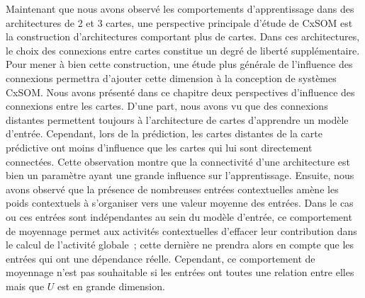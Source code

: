 \documentclass[../main]{subfiles}
\begin{document}
Maintenant que nous avons observé les comportements d'apprentissage dans des architectures de 2 et 3 cartes, une perspective principale d'étude de CxSOM est la construction d'architectures comportant plus de cartes.
Dans ces architectures, le choix des connexions entre cartes constitue un degré de liberté supplémentaire.
Pour mener à bien cette construction, une étude plus générale de l'influence des connexions permettra d'ajouter cette dimension à la conception de systèmes CxSOM.
Nous avons présenté dans ce chapitre deux perspectives d'influence des connexions entre les cartes.
D'une part, nous avons vu que des connexions distantes permettent toujours à l'architecture de cartes d'apprendre un modèle d'entrée. Cependant, lors de la prédiction, les cartes distantes de la carte prédictive ont moins d'influence que les cartes qui lui sont directement connectées. Cette observation montre que la connectivité d'une architecture est bien un paramètre ayant une grande influence sur l'apprentissage. 
Ensuite, nous avons observé que la présence de nombreuses entrées contextuelles amène les poids contextuels à s'organiser vers une valeur moyenne des entrées. Dans le cas ou ces entrées sont indépendantes au sein du modèle d'entrée, ce comportement de moyennage permet aux activités contextuelles d'effacer leur contribution dans le calcul de l'activité globale~; cette dernière ne prendra alors en compte que les entrées qui ont une dépendance réelle. Cependant, ce comportement de moyennage n'est pas souhaitable si les entrées ont toutes une relation entre elles mais que $U$ est en grande dimension.
\end{document}
